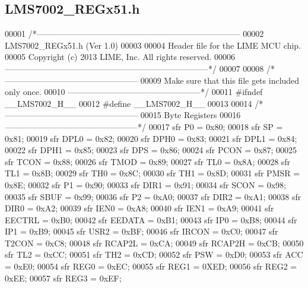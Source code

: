 \subsection{L\+M\+S7002\+\_\+\+R\+E\+Gx51.\+h}
\label{LMS7002__REGx51_8h_source}

\begin{DoxyCode}
00001 \textcolor{comment}{/*--------------------------------------------------------------------------}
00002 \textcolor{comment}{LMS7002\_REGx51.h (Ver 1.0)}
00003 \textcolor{comment}{}
00004 \textcolor{comment}{Header file for the LIME MCU chip.}
00005 \textcolor{comment}{Copyright (c) 2013 LIME, Inc.  All rights reserved.}
00006 \textcolor{comment}{--------------------------------------------------------------------------*/}
00007 
00008 \textcolor{comment}{/*------------------------------------------------}
00009 \textcolor{comment}{Make sure that this file gets included only once.}
00010 \textcolor{comment}{------------------------------------------------*/}
00011 \textcolor{preprocessor}{#ifndef \_\_LMS7002\_H\_\_}
00012 \textcolor{preprocessor}{#define \_\_LMS7002\_H\_\_}
00013 
00014 \textcolor{comment}{/*------------------------------------------------}
00015 \textcolor{comment}{Byte Registers}
00016 \textcolor{comment}{------------------------------------------------*/}
00017 sfr P0    = 0x80;
00018 sfr SP    = 0x81;
00019 sfr DPL0  = 0x82; 
00020 sfr DPH0  = 0x83; 
00021 sfr DPL1  = 0x84; 
00022 sfr DPH1  = 0x85;
00023 sfr DPS   = 0x86; 
00024 sfr PCON  = 0x87; 
00025 sfr TCON  = 0x88; 
00026 sfr TMOD  = 0x89;
00027 sfr TL0   = 0x8A;
00028 sfr TL1   = 0x8B;
00029 sfr TH0   = 0x8C;
00030 sfr TH1   = 0x8D;
00031 sfr PMSR  = 0x8E; 
00032 sfr P1    = 0x90; 
00033 sfr DIR1    = 0x91; 
00034 sfr SCON  = 0x98;
00035 sfr SBUF  = 0x99;
00036 sfr P2    = 0xA0;
00037 sfr DIR2    = 0xA1; 
00038 sfr DIR0    = 0xA2; 
00039 sfr IEN0    = 0xA8; 
00040 sfr IEN1    = 0xA9; 
00041 sfr EECTRL  = 0xB0; 
00042 sfr EEDATA  = 0xB1; 
00043 sfr IP0     = 0xB8; 
00044 sfr IP1   = 0xB9; 
00045 sfr USR2    = 0xBF; 
00046 sfr IRCON   = 0xC0; 
00047 sfr T2CON   = 0xC8; 
00048 sfr RCAP2L  = 0xCA; 
00049 sfr RCAP2H  = 0xCB; 
00050 sfr TL2 = 0xCC; 
00051 sfr TH2 = 0xCD; 
00052 sfr PSW   = 0xD0;
00053 sfr ACC   = 0xE0;
00054 sfr REG0    = 0xEC; 
00055 sfr REG1    = 0XED; 
00056 sfr REG2    = 0xEE; 
00057 sfr REG3    = 0xEF; 

\end{DoxyCode}
